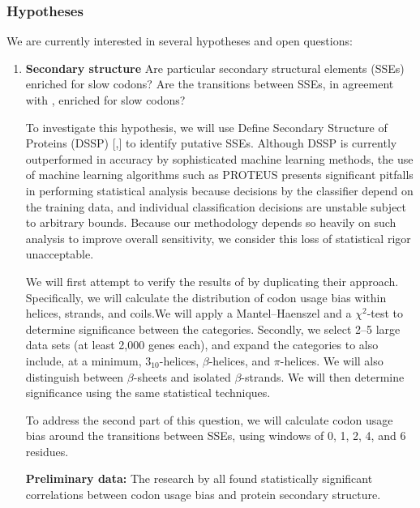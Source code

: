 \documentclass[11pt]{nih}
\newcommand{\todo}[1]{
\addcontentsline{tdo}{todo}{\protect{#1}}
\textcolor{red}{TODO: #1}
}
\begin{document}
\subsubsection{Hypotheses}
We are currently interested in several hypotheses and open questions:
\begin{enumerate}
\item \textbf{Secondary structure}
Are particular secondary structural elements (SSEs) enriched for slow codons? Are the transitions between SSEs, in agreement with \citet{Saunders2010}, enriched for slow codons?

To investigate this hypothesis, we will use Define Secondary Structure of Proteins (DSSP) [,] to identify putative SSEs. Although DSSP is currently outperformed in accuracy by sophisticated machine learning methods, the use of machine learning algorithms such as PROTEUS presents significant pitfalls in performing statistical analysis because decisions by the classifier depend on the training data, and individual classification decisions are unstable subject to arbitrary bounds. Because our methodology depends so heavily on such analysis to improve overall sensitivity, we consider this loss of statistical rigor unacceptable.

We will first attempt to verify the results of \citet{Saunders2010} by duplicating their approach. Specifically, we will calculate the distribution of codon usage bias within helices, strands, and coils.We will apply a Mantel--Haenszel and a $\chi^2$-test to determine significance between the categories. Secondly, we select 2--5 large data sets (at least 2,000 genes each), and expand the categories to also include, at a minimum, $3_{10}$-helices, $\beta$-helices, and $\pi$-helices. We will also distinguish between $\beta$-sheets and isolated $\beta$-strands. We will then determine significance using the same statistical techniques.

To address the second part of this question, we will calculate codon usage bias around the transitions between SSEs, using windows of 0, 1, 2, 4, and 6 residues.

\textbf{Preliminary data:} The research by \citet{Saunders2010,Oresic2003,Gu2003,Thanaraj1996a} all found statistically significant correlations between codon usage bias and protein secondary structure.


\end{enumerate}
\end{document}
